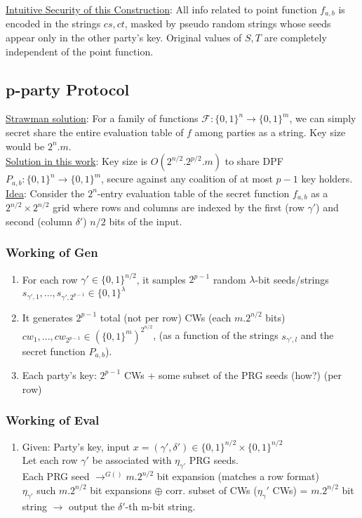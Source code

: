 \noindent \underline{Intuitive Security of this Construction}: All info related to point function $f_{a, b}$ is encoded in the strings $cs, ct$, masked by pseudo random strings whose seeds appear only in the other party's key. Original values of $S, T$ are completely independent of the point function.

\subsection{p-party Protocol}
\underline{Strawman solution}: For a family of functions $\mathcal{F}: \{0, 1\}^n \rightarrow \{0, 1\}^m$, we can simply secret share the entire evaluation table of $f$ among parties as a string. Key size would be $2^n.m$. \\

\noindent \underline{Solution in this work}: Key size is $O(2^{n/2}.2^{p/2}.m)$ to share DPF $P_{a, b}: \{0, 1\}^n \rightarrow \{0, 1\}^m$, secure against any coalition of at most $p-1$ key holders. \\

\noindent \underline{Idea}: Consider the $2^n$-entry evaluation table of the secret function $f_{a, b}$ as a $2^{n/2} \times 2^{n/2}$ grid where rows and columns are indexed by the first (row $\gamma'$) and second (column $\delta'$) $n/2$ bits of the input.

\subsubsection{Working of Gen}
\begin{enumerate}
    \item For each row $\gamma' \in \{0, 1\}^{n/2}$, it samples $2^{p-1}$ random $\lambda$-bit seeds/strings $s_{\gamma', 1}, ..., s_{\gamma', 2^{p-1}} \in \{0, 1\}^\lambda$ 
    \item It generates $2^{p-1}$ total (not per row) CWs (each $m.2^{n/2}$ bits) $cw_1, ..., cw_{2^{p-1}} \in (\{0, 1\}^m)^{2^{n/2}}$, (as a function of the strings $s_{\gamma', l}$ and the secret function $P_{a, b}$).
    \item Each party's key: $2^{p-1}$ CWs + some subset of the PRG seeds (how?) (per row) 
\end{enumerate}

\subsubsection{Working of Eval}
\begin{enumerate}
    \item Given: Party's key, input $x = (\gamma', \delta') \in \{0, 1\}^{n/2} \times \{0, 1\}^{n/2}$ \\
        Let each row $\gamma'$ be associated with $\eta_{\gamma'}$ PRG seeds. \\
        Each PRG seed $\rightarrow^{G()} m.2^{n/2}$ bit expansion (matches a row format) \\
        $\eta_{\gamma'}$ such $m.2^{n/2}$ bit expansions $\oplus$ corr. subset of CWs ($\eta_\gamma'$ CWs) = $m.2^{n/2}$ bit string $\rightarrow$ output the $\delta'$-th m-bit string. 
\end{enumerate}

